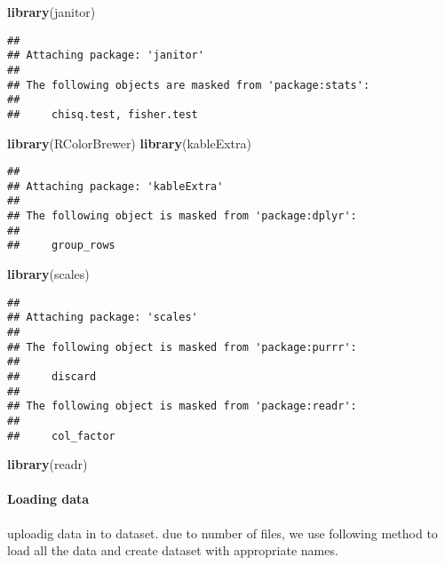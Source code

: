 \documentclass[
]{article}
\newenvironment{Shaded}{\begin{snugshade}}{\end{snugshade}}
\newcommand{\FunctionTok}[1]{\textcolor[rgb]{0.13,0.29,0.53}{\textbf{#1}}}
\newcommand{\NormalTok}[1]{#1}
\begin{document}
\begin{Shaded}
\begin{Highlighting}[]
\FunctionTok{library}\NormalTok{(janitor)}
\end{Highlighting}
\end{Shaded}

\begin{verbatim}
## 
## Attaching package: 'janitor'
## 
## The following objects are masked from 'package:stats':
## 
##     chisq.test, fisher.test
\end{verbatim}

\begin{Shaded}
\begin{Highlighting}[]
\FunctionTok{library}\NormalTok{(RColorBrewer)}
\FunctionTok{library}\NormalTok{(kableExtra)}
\end{Highlighting}
\end{Shaded}

\begin{verbatim}
## 
## Attaching package: 'kableExtra'
## 
## The following object is masked from 'package:dplyr':
## 
##     group_rows
\end{verbatim}

\begin{Shaded}
\begin{Highlighting}[]
\FunctionTok{library}\NormalTok{(scales)}
\end{Highlighting}
\end{Shaded}

\begin{verbatim}
## 
## Attaching package: 'scales'
## 
## The following object is masked from 'package:purrr':
## 
##     discard
## 
## The following object is masked from 'package:readr':
## 
##     col_factor
\end{verbatim}

\begin{Shaded}
\begin{Highlighting}[]
\FunctionTok{library}\NormalTok{(readr)}
\end{Highlighting}
\end{Shaded}

\paragraph{Loading data}\label{loading-data}

uploadig data in to dataset. due to number of files, we use following
method to load all the data and create dataset with appropriate names.
\end{document}
